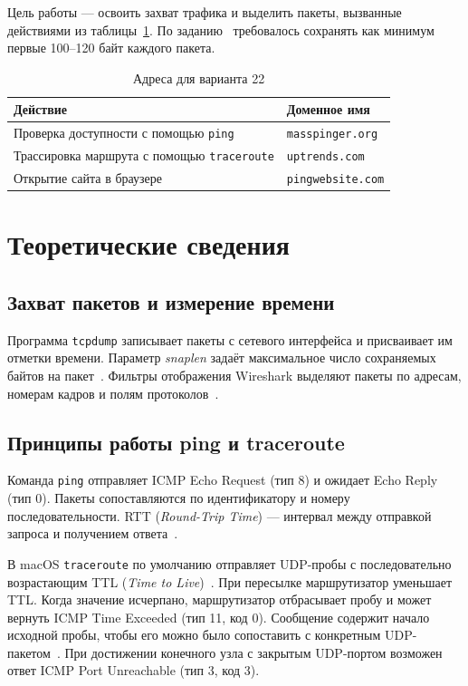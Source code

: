 \documentclass[a4paper,14pt]{extarticle}
\begin{document}
Цель работы --- освоить захват трафика и выделить пакеты, вызванные действиями из таблицы~\ref{tab:targets}. По заданию~\cite{assignment} требовалось сохранять как минимум первые 100--120 байт каждого пакета.

\begin{table}[htbp]
  \centering
  \caption{Адреса для варианта 22}
  \label{tab:targets}
  \begin{tabularx}{\linewidth}{@{}X l@{}}
    \toprule
    Действие & Доменное имя \\
    \midrule
    Проверка доступности с помощью \texttt{ping} & \texttt{masspinger.org} \\
    Трассировка маршрута с помощью \texttt{traceroute} & \texttt{uptrends.com} \\
    Открытие сайта в браузере & \texttt{pingwebsite.com} \\
    \bottomrule
  \end{tabularx}
\end{table}

\section{Теоретические сведения}

\subsection{Захват пакетов и измерение времени}

Программа \texttt{tcpdump} записывает пакеты с сетевого интерфейса и присваивает им отметки времени. Параметр \textit{snaplen} задаёт максимальное число сохраняемых байтов на пакет~\cite{tcpdump}. Фильтры отображения Wireshark выделяют пакеты по адресам, номерам кадров и полям протоколов~\cite{wireshark}.

\subsection{Принципы работы ping и traceroute}

Команда \texttt{ping} отправляет ICMP Echo Request (тип 8) и ожидает Echo Reply (тип 0). Пакеты сопоставляются по идентификатору и номеру последовательности. RTT (\textit{Round-Trip Time}) --- интервал между отправкой запроса и получением ответа~\cite{icmp}.

В macOS \texttt{traceroute} по умолчанию отправляет UDP-пробы с последовательно возрастающим TTL (\textit{Time to Live})~\cite{traceroute}. При пересылке маршрутизатор уменьшает TTL. Когда значение исчерпано, маршрутизатор отбрасывает пробу и может вернуть ICMP Time Exceeded (тип 11, код 0). Сообщение содержит начало исходной пробы, чтобы его можно было сопоставить с конкретным UDP-пакетом~\cite{icmp}. При достижении конечного узла с закрытым UDP-портом возможен ответ ICMP Port Unreachable (тип 3, код 3).
\end{document}
